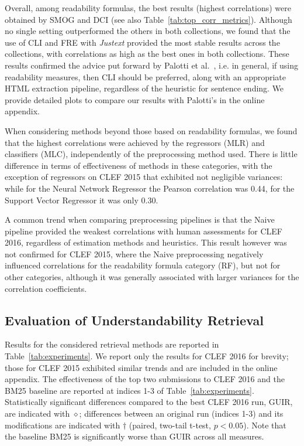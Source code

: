 Overall, among readability formulas, the best results (highest correlations) were obtained by SMOG and DCI (see also Table~\ref{tab:top_corr_metrics}). Although no single setting outperformed the others in both collections, we found that the use of CLI and FRE with \textit{Justext} provided the most stable results across the collections, with correlations as high as the best ones in both collections.
These results confirmed the advice put forward by Palotti et al.~\cite{palotti15}, i.e. in general, if using readability measures, then CLI should be preferred, along with an appropriate HTML extraction pipeline, regardless of the heuristic for sentence ending. We provide detailed plots to compare our results with Palotti's in the online appendix.

When considering methods beyond those based on readability formulas, we found that the highest correlations were achieved by the regressors (MLR) and classifiers (MLC), independently of the preprocessing method used. There is little difference in terms of effectiveness of methods in these categories, with the exception of regressors on CLEF 2015 that exhibited not negligible variances: while for the Neural Network Regressor the Pearson correlation was 0.44, for the Support Vector Regressor it was only 0.30.

A common trend when comparing preprocessing pipelines is that the Naive pipeline provided the weakest correlations with human assessments for CLEF 2016, regardless of estimation methods and heuristics. This result however was not confirmed for CLEF 2015, where the Naive preprocessing negatively influenced correlations for the readability formula category (RF), but not for other categories, although it was generally associated with larger variances for the correlation coefficients.


\subsection*{Evaluation of Understandability Retrieval}
\label{sec:results}




Results for the considered retrieval methods are reported in Table~\ref{tab:experiments}. We report only the results for CLEF 2016 for brevity; those for CLEF 2015 exhibited similar trends and are included in the online appendix. The effectiveness of the top two submissions to CLEF 2016 and the BM25 baseline are reported at indices 1-3 of Table~\ref{tab:experiments}. Statistically significant differences compared to the best CLEF 2016 run, GUIR, are indicated with $\diamond$; differences between an original run (indices 1-3) and its modifications are indicated with $\dagger$ (paired, two-tail t-test, $p<0.05$). Note that the baseline BM25 is significantly worse than GUIR across all measures. 

